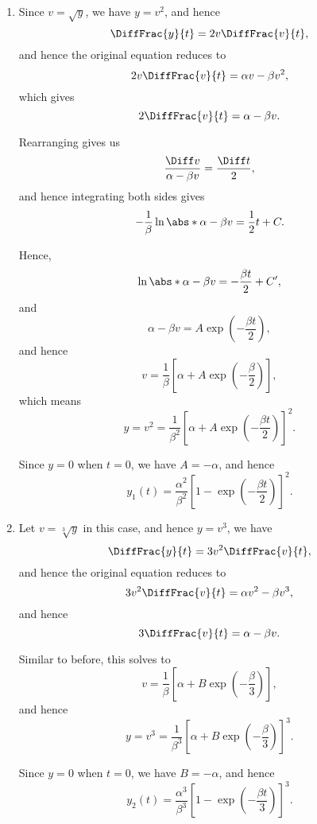 \Question{\currfilebase}

\begin{enumerate}
    \item Since \(v = \sqrt{y}\), we have \(y = v^2\), and hence
          \[
              \DiffFrac{y}{t} = 2v \DiffFrac{v}{t},
          \]
          and hence the original equation reduces to
          \[
              2v \DiffFrac{v}{t} = \alpha v - \beta v^2,
          \]
          which gives
          \[
              2\DiffFrac{v}{t} = \alpha - \beta v.
          \]

          Rearranging gives us
          \[
              \frac{\Diff v}{\alpha - \beta v} = \frac{\Diff t}{2},
          \]
          and hence integrating both sides gives
          \[
              -\frac{1}{\beta} \ln\abs*{\alpha - \beta v} = \frac{1}{2} t + C.
          \]

          Hence,
          \[
              \ln \abs*{\alpha - \beta v} = -\frac{\beta t}{2} + C',
          \]
          and
          \[
              \alpha - \beta v = A \exp\left(- \frac{\beta t}{2}\right),
          \]
          and hence
          \[
              v = \frac{1}{\beta} \left[\alpha + A \exp\left(- \frac{\beta}{2}\right)\right],
          \]
          which means
          \[
              y = v^2 = \frac{1}{\beta^2} \left[\alpha + A \exp\left(- \frac{\beta t}{2}\right)\right]^2.
          \]

          Since \(y = 0\) when \(t = 0\), we have \(A = - \alpha\), and hence
          \[
              y_1(t) = \frac{\alpha^2}{\beta^2} \left[1 - \exp\left(- \frac{\beta t}{2}\right)\right]^2.
          \]

    \item Let \(v = \sqrt[3]{y}\) in this case, and hence \(y = v^3\), we have
          \[
              \DiffFrac{y}{t} = 3v^2 \DiffFrac{v}{t},
          \]
          and hence the original equation reduces to
          \[
              3v^2 \DiffFrac{v}{t} = \alpha v^2 - \beta v^3,
          \]
          and hence
          \[
              3 \DiffFrac{v}{t} = \alpha - \beta v.
          \]

          Similar to before, this solves to
          \[
              v = \frac{1}{\beta} \left[\alpha + B \exp\left(- \frac{\beta}{3}\right)\right],
          \]
          and hence
          \[
              y = v^3 = \frac{1}{\beta^3} \left[\alpha + B \exp\left(- \frac{\beta}{3}\right)\right]^3.
          \]

          Since \(y = 0\) when \(t = 0\), we have \(B = -\alpha\), and hence
          \[
              y_2(t) = \frac{\alpha^3}{\beta^3} \left[1 - \exp\left(- \frac{\beta t}{3}\right)\right]^3.
          \]


\end{enumerate}

